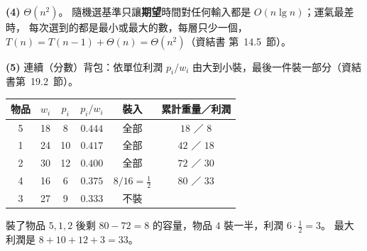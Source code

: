 \begin{pastsoln}
\textbf{(4)} $\Theta(n^2)$。 隨機選基準只讓\textbf{期望}時間對任何輸入都是 $O(n \lg n)$；運氣最差時，
每次選到的都是最小或最大的數，每層只少一個，$T(n) = T(n-1) + \Theta(n) = \Theta(n^2)$（資結書
第~14.5~節）。

\textbf{(5)} 連續（分數）背包：依單位利潤 $p_i/w_i$ 由大到小裝，最後一件裝一部分（資結書第~19.2~節）。
\begin{center}
\small
\begin{tabular}{cccccc}
\toprule
物品 & $w_i$ & $p_i$ & $p_i / w_i$ & 裝入 & 累計重量／利潤 \\
\midrule
5 & 18 & 8 & $0.444$ & 全部 & $18$ ／ $8$ \\
1 & 24 & 10 & $0.417$ & 全部 & $42$ ／ $18$ \\
2 & 30 & 12 & $0.400$ & 全部 & $72$ ／ $30$ \\
4 & 16 & 6 & $0.375$ & $8/16 = \frac12$ & $80$ ／ $33$ \\
3 & 27 & 9 & $0.333$ & 不裝 & \\
\bottomrule
\end{tabular}
\end{center}
裝了物品 $5, 1, 2$ 後剩 $80 - 72 = 8$ 的容量，物品 $4$ 裝一半，利潤 $6 \cdot \frac12 = 3$。 最大利潤是
$8 + 10 + 12 + 3 = 33$。
\end{pastsoln}
